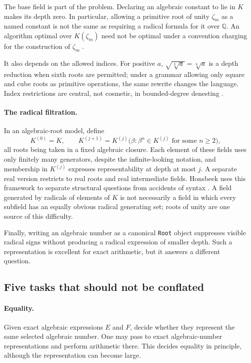 \documentclass[11pt,oneside]{article}
\numberwithin{equation}{section}
\theoremstyle{definition}
\theoremstyle{remark}
\newcommand{\Q}{\mathbb{Q}}
\begin{document}
The base field is part of the problem. Declaring an algebraic constant to lie in $K$ makes its depth zero. In particular, allowing a primitive root of unity $\zeta_m$ as a named constant is not the same as requiring a radical formula for it over $\Q$. An algorithm optimal over $K(\zeta_m)$ need not be optimal under a convention charging for the construction of $\zeta_m$ \cite{landau,hornghuang,honsbeek}.

It also depends on the allowed indices. For positive $a$, $\sqrt{\sqrt[3]a}=\sqrt[6]a$ is a depth reduction when sixth roots are permitted; under a grammar allowing only square and cube roots as primitive operations, the same rewrite changes the language. Index restrictions are central, not cosmetic, in bounded-degree denesting \cite{blomer2000}.

\paragraph{The radical filtration.} In an algebraic-root model, define
\begin{equation}\label{eq:filtration}
K^{(0)}=K,\qquad
K^{(j+1)}=K^{(j)}\bigl(\beta:\beta^n\in K^{(j)}\text{ for some }n\ge2\bigr),
\end{equation}
all roots being taken in a fixed algebraic closure. Each element of these fields uses only finitely many generators, despite the infinite-looking notation, and membership in $K^{(j)}$ expresses representability at depth at most $j$. A separate real version restricts to real roots and real intermediate fields. Honsbeek uses this framework to separate structural questions from accidents of syntax \cite{honsbeek}. A field generated by radicals of elements of $K$ is not necessarily a field in which every subfield has an equally obvious radical generating set; roots of unity are one source of this difficulty.

Finally, writing an algebraic number as a canonical \texttt{Root} object suppresses visible radical signs without producing a radical expression of smaller depth. Such a representation is excellent for exact arithmetic, but it answers a different question.

\subsection{Five tasks that should not be conflated}
\paragraph{Equality.} Given exact algebraic expressions $E$ and $F$, decide whether they represent the same selected algebraic number. One may pass to exact algebraic-number representations and perform arithmetic there. This decides equality in principle, although the representation can become large.
\end{document}

